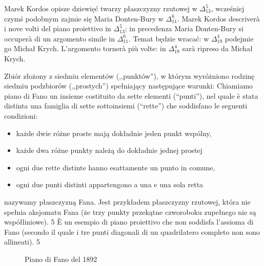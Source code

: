 Marek Kordos opisze dziewięć twarzy płaszczyzny rzutowej w $\Delta_{13}^5$, wcześniej czymś podobnym zajmie się Maria Donten-Bury w $\Delta_{11}^6$. %
Marek Kordos descriverà i nove volti del piano proiettivo in $\Delta_{13}^5$; in precedenza Maria Donten-Bury si occuperà di un argomento simile in $\Delta_{11}^6$. %
Temat będzie wracać: w $\Delta_{19}^4$ podejmie go Michał Krych. %
L'argomento tornerà più volte: in $\Delta_{19}^4$ sarà ripreso da Michał Krych. %

\begin{example}
[płaszczyzna Fana] %
[piano di Fano] %
    Zbiór złożony z siedmiu elementów (,,punktów''), w którym wyróżniono rodzinę siedmiu podzbiorów (,,prostych'') spełniający następujące warunki: %
    Chiamiamo piano di Fano un insieme costituito da sette elementi (``punti''), nel quale è stata distinta una famiglia di sette sottoinsiemi (``rette'') che soddisfano le seguenti condizioni: %
    \begin{itemize}
        \item każde dwie różne proste mają dokładnie jeden punkt wspólny, %
        \item każde dwa różne punkty należą do dokładnie jednej prostej %
        \item ogni due rette distinte hanno esattamente un punto in comune, %
        \item ogni due punti distinti appartengono a una e una sola retta %
    \end{itemize}
    nazywamy płaszczyzną Fana. %
    Jest przykładem płaszczyzny rzutowej, która nie spełnia aksjomatu Fana (że trzy punkty przekątne czworoboku zupełnego nie są współliniowe). %
    5 %
    È un esempio di piano proiettivo che non soddisfa l'assioma di Fano (secondo il quale i tre punti diagonali di un quadrilatero completo non sono allineati). %
    5 %
    \begin{figure}[H]
        \centering
    \caption{Płaszczyzna Fana z 1892 roku} %
    \caption{Piano di Fano del 1892} %
\end{figure}
\end{example}

